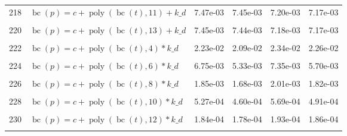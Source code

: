 \documentclass[12pt,a4paper]{article}
\DeclareMathOperator{\bc}{bc}
\DeclareMathOperator{\poly}{poly}
\begin{document}
\begin{longtable}[t]{ll>{\raggedleft\arraybackslash}p{2cm}>{\raggedleft\arraybackslash}p{2cm}>{\raggedleft\arraybackslash}p{2cm}>{\raggedleft\arraybackslash}p{2cm}}
218 & $\bc(p) = c + \poly\left( \bc(t), 11 \right) + k\_d$ & 7.47e-03 & 7.45e-03 & 7.20e-03 & 7.17e-03\\
\cellcolor{gray!6}{219} & \cellcolor{gray!6}{$\bc(p) = c + \poly\left( \bc(t), 12 \right) + k\_d$} & \cellcolor{gray!6}{7.45e-03} & \cellcolor{gray!6}{7.44e-03} & \cellcolor{gray!6}{7.18e-03} & \cellcolor{gray!6}{7.16e-03}\\
220 & $\bc(p) = c + \poly\left( \bc(t), 13 \right) + k\_d$ & 7.45e-03 & 7.44e-03 & 7.18e-03 & 7.17e-03\\
\cellcolor{gray!6}{221} & \cellcolor{gray!6}{$\bc(p) = c + \poly\left( \bc(t), 3 \right) * k\_d$} & \cellcolor{gray!6}{5.54e-02} & \cellcolor{gray!6}{1.71e-02} & \cellcolor{gray!6}{1.91e-02} & \cellcolor{gray!6}{1.78e-02}\\
222 & $\bc(p) = c + \poly\left( \bc(t), 4 \right) * k\_d$ & 2.23e-02 & 2.09e-02 & 2.34e-02 & 2.26e-02\\
\cellcolor{gray!6}{223} & \cellcolor{gray!6}{$\bc(p) = c + \poly\left( \bc(t), 5 \right) * k\_d$} & \cellcolor{gray!6}{9.03e-03} & \cellcolor{gray!6}{9.02e-03} & \cellcolor{gray!6}{8.65e-03} & \cellcolor{gray!6}{8.65e-03}\\
224 & $\bc(p) = c + \poly\left( \bc(t), 6 \right) * k\_d$ & 6.75e-03 & 5.33e-03 & 7.35e-03 & 5.70e-03\\
\cellcolor{gray!6}{225} & \cellcolor{gray!6}{$\bc(p) = c + \poly\left( \bc(t), 7 \right) * k\_d$} & \cellcolor{gray!6}{2.23e-03} & \cellcolor{gray!6}{2.09e-03} & \cellcolor{gray!6}{2.31e-03} & \cellcolor{gray!6}{2.16e-03}\\
226 & $\bc(p) = c + \poly\left( \bc(t), 8 \right) * k\_d$ & 1.85e-03 & 1.68e-03 & 2.01e-03 & 1.82e-03\\
\cellcolor{gray!6}{227} & \cellcolor{gray!6}{$\bc(p) = c + \poly\left( \bc(t), 9 \right) * k\_d$} & \cellcolor{gray!6}{5.97e-04} & \cellcolor{gray!6}{5.78e-04} & \cellcolor{gray!6}{5.90e-04} & \cellcolor{gray!6}{5.66e-04}\\
228 & $\bc(p) = c + \poly\left( \bc(t), 10 \right) * k\_d$ & 5.27e-04 & 4.60e-04 & 5.69e-04 & 4.91e-04\\
\cellcolor{gray!6}{229} & \cellcolor{gray!6}{$\bc(p) = c + \poly\left( \bc(t), 11 \right) * k\_d$} & \cellcolor{gray!6}{1.85e-04} & \cellcolor{gray!6}{1.83e-04} & \cellcolor{gray!6}{1.90e-04} & \cellcolor{gray!6}{1.88e-04}\\
230 & $\bc(p) = c + \poly\left( \bc(t), 12 \right) * k\_d$ & 1.84e-04 & 1.78e-04 & 1.93e-04 & 1.86e-04\\
\cellcolor{gray!6}{231} & \cellcolor{gray!6}{$\bc(p) = c + \poly\left( \bc(t), 13 \right) * k\_d$} & \cellcolor{gray!6}{1.45e-04} & \cellcolor{gray!6}{1.45e-04} & \cellcolor{gray!6}{1.53e-04} & \cellcolor{gray!6}{1.52e-04}\\*
\end{longtable}
\endgroup{}
\end{document}
